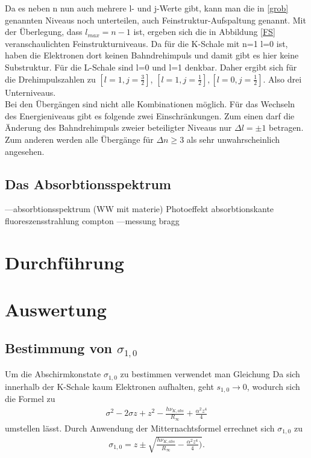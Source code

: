 Da es neben n nun auch mehrere l- und j-Werte gibt, kann man die in \ref{grob} genannten Niveaus noch unterteilen, auch 
Feinstruktur-Aufspaltung genannt. Mit der Überlegung, dass $l_{max} = n-1$ ist, ergeben sich die in Abbildung \eqref{FS}
veranschaulichten Feinstrukturniveaus. Da für die K-Schale mit n=1 l=0 ist, haben die Elektronen dort keinen Bahndrehimpuls
und damit gibt es hier keine Substruktur. Für die L-Schale sind l=0 und l=1 denkbar. Daher ergibt sich für die Drehimpulszahlen
zu $[l=1,j=\frac32]$, $[l=1,j=\frac12],[l=0,j=\frac12] $. Also drei Unterniveaus.\\
Bei den Übergängen sind nicht alle Kombinationen möglich. Für das Wechseln des Energieniveaus gibt es folgende zwei Einschränkungen.
Zum einen darf die Änderung des Bahndrehimpuls zweier beteiligter Niveaus nur $\Delta l = \pm1$ betragen. Zum anderen werden
alle Übergänge für $\Delta n \ge 3$ als sehr unwahrscheinlich angesehen.

\subsection{Das Absorbtionsspektrum}



\newpage

---absorbtionsspektrum (WW mit materie)
Photoeffekt
absorbtionskante
fluoreszensstrahlung
compton
---messung
bragg
\section{Durchführung}

\section{Auswertung}
\subsection{Bestimmung von $\sigma_{1,0}$}
Um die Abschirmkonstate $\sigma_{1,0}$ zu bestimmen verwendet man Gleichung %
Da sich innerhalb der K-Schale kaum Elektronen aufhalten, geht $s_{1,0}\rightarrow 0$, wodurch sich die Formel zu
\begin{align}
\sigma^2-2\sigma z+z^2-\frac{h\nu_{K,abs}}{R_\infty}+\frac{\alpha^2z^4}{4}
\end{align}
umstellen lässt.
Durch Anwendung der Mitternachtsformel errechnet sich $\sigma_{1,0}$ zu
\begin{align}
\sigma_{1,0}=z\pm\sqrt{\frac{h\nu_{K,abs}}{R_\infty}-\frac{\alpha^2z^4}{4})}.
\end{align}

